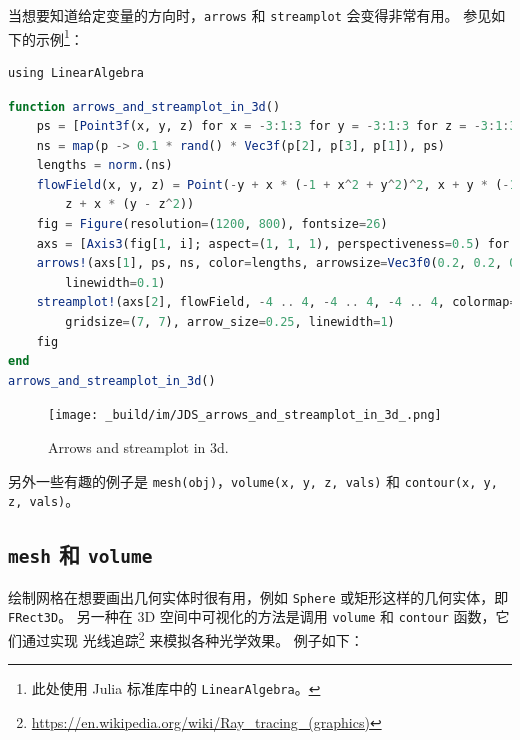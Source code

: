 \documentclass[
  notoc %
]{tufte-book}
\DeclareRobustCommand{\href}[2]{#2\footnote{\url{#1}}}
\newcommand{\passthrough}[1]{#1}
\begin{document}
当想要知道给定变量的方向时，\passthrough{\lstinline!arrows!} 和
\passthrough{\lstinline!streamplot!} 会变得非常有用。
参见如下的示例\footnote{此处使用 Julia 标准库中的
  \passthrough{\lstinline!LinearAlgebra!}。}：

\begin{lstlisting}
using LinearAlgebra
\end{lstlisting}

\begin{lstlisting}[language=Julia]
function arrows_and_streamplot_in_3d()
    ps = [Point3f(x, y, z) for x = -3:1:3 for y = -3:1:3 for z = -3:1:3]
    ns = map(p -> 0.1 * rand() * Vec3f(p[2], p[3], p[1]), ps)
    lengths = norm.(ns)
    flowField(x, y, z) = Point(-y + x * (-1 + x^2 + y^2)^2, x + y * (-1 + x^2 + y^2)^2,
        z + x * (y - z^2))
    fig = Figure(resolution=(1200, 800), fontsize=26)
    axs = [Axis3(fig[1, i]; aspect=(1, 1, 1), perspectiveness=0.5) for i = 1:2]
    arrows!(axs[1], ps, ns, color=lengths, arrowsize=Vec3f0(0.2, 0.2, 0.3),
        linewidth=0.1)
    streamplot!(axs[2], flowField, -4 .. 4, -4 .. 4, -4 .. 4, colormap=:plasma,
        gridsize=(7, 7), arrow_size=0.25, linewidth=1)
    fig
end
arrows_and_streamplot_in_3d()
\end{lstlisting}

\begin{figure}
\hypertarget{fig:arrows_and_streamplot_in_3d}{%
\centering
\texttt{[image: \_build/im/JDS\_arrows\_and\_streamplot\_in\_3d\_.png]}
\caption{Arrows and streamplot in
3d.}\label{fig:arrows_and_streamplot_in_3d}
}
\end{figure}

另外一些有趣的例子是
\passthrough{\lstinline!mesh(obj)!}，\passthrough{\lstinline!volume(x, y, z, vals)!}
和 \passthrough{\lstinline!contour(x, y, z, vals)!}。

\hypertarget{mesh-ux548c-volume}{%
\subsection{\texorpdfstring{\texttt{mesh} 和
\texttt{volume}}{mesh 和 volume}}\label{mesh-ux548c-volume}}

绘制网格在想要画出几何实体时很有用，例如
\passthrough{\lstinline!Sphere!} 或矩形这样的几何实体，即
\passthrough{\lstinline!FRect3D!}。 另一种在 3D 空间中可视化的方法是调用
\passthrough{\lstinline!volume!} 和 \passthrough{\lstinline!contour!}
函数，它们通过实现
\href{https://en.wikipedia.org/wiki/Ray_tracing_(graphics)}{光线追踪}
来模拟各种光学效果。 例子如下：
\end{document}
